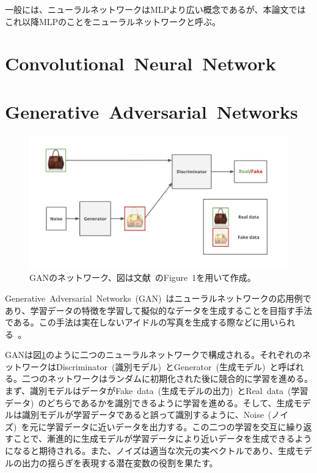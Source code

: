 一般には、ニューラルネットワークはMLPより広い概念であるが、本論文ではこれ以降MLPのことをニューラルネットワークと呼ぶ。

\section{Convolutional~Neural~Network}




\section{Generative~Adversarial~Networks}

\begin{figure}[t]
\begin{center}
\includegraphics[width=\hsize]{figure/GAN_net.png}
\caption{GANのネットワーク、図は文献~\cite{pix2pix}のFigure~1を用いて作成。}
\label{fig:GAN_net}
\end{center}
\end{figure}

Generative~Adversarial~Networks~(GAN)~\cite{GAN}はニューラルネットワークの応用例であり、学習データの特徴を学習して擬似的なデータを生成することを目指す手法である。この手法は実在しないアイドルの写真を生成する際などに用いられる~\cite{idol}。

GANは図\ref{fig:GAN_net}のように二つのニューラルネットワークで構成される。それぞれのネットワークはDiscriminator~(識別モデル)~とGenerator~(生成モデル)~と呼ばれる。二つのネットワークはランダムに初期化された後に競合的に学習を進める。まず、識別モデルはデータがFake~data~(生成モデルの出力)~とReal~data~(学習データ)~のどちらであるかを識別できるように学習を進める。そして、生成モデルは識別モデルが学習データであると誤って識別するように、Noise~(ノイズ)~を元に学習データに近いデータを出力する。この二つの学習を交互に繰り返すことで、漸進的に生成モデルが学習データにより近いデータを生成できるようになると期待される。また、ノイズは適当な次元の実ベクトルであり、生成モデルの出力の揺らぎを表現する潜在変数の役割を果たす。

